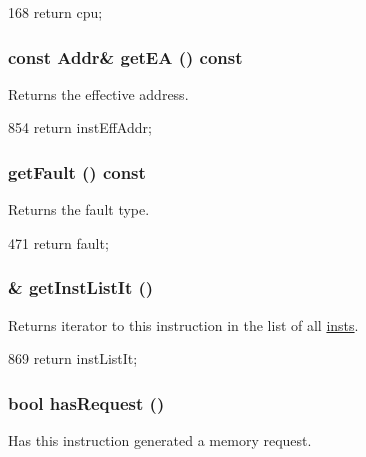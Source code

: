 \begin{DoxyCode}
168 { return cpu; }
\end{DoxyCode}
\hypertarget{classBaseDynInst_a6fd9d852d5780eb802b4d2520e58747b}{
\subsubsection[{getEA}]{\setlength{\rightskip}{0pt plus 5cm}const {\bf Addr}\& getEA () const}}
\label{classBaseDynInst_a6fd9d852d5780eb802b4d2520e58747b}
Returns the effective address. 


\begin{DoxyCode}
854 { return instEffAddr; }
\end{DoxyCode}
\hypertarget{classBaseDynInst_a1ac977937b0a3cf64e58ba7141e4cc11}{
\subsubsection[{getFault}]{ getFault () const}}
\label{classBaseDynInst_a1ac977937b0a3cf64e58ba7141e4cc11}
Returns the fault type. 


\begin{DoxyCode}
471 { return fault; }
\end{DoxyCode}
\hypertarget{classBaseDynInst_a3dc054e66fce6c154e88f4c1ecc868d2}{
\subsubsection[{getInstListIt}]{\& getInstListIt ()}}
\label{classBaseDynInst_a3dc054e66fce6c154e88f4c1ecc868d2}
Returns iterator to this instruction in the list of all \hyperlink{namespaceinsts}{insts}. 


\begin{DoxyCode}
869 { return instListIt; }
\end{DoxyCode}
\hypertarget{classBaseDynInst_ad04e6525dc209abe51106ce7fde57576}{
\subsubsection[{hasRequest}]{\setlength{\rightskip}{0pt plus 5cm}bool hasRequest ()}}
\label{classBaseDynInst_ad04e6525dc209abe51106ce7fde57576}
Has this instruction generated a memory request. 



